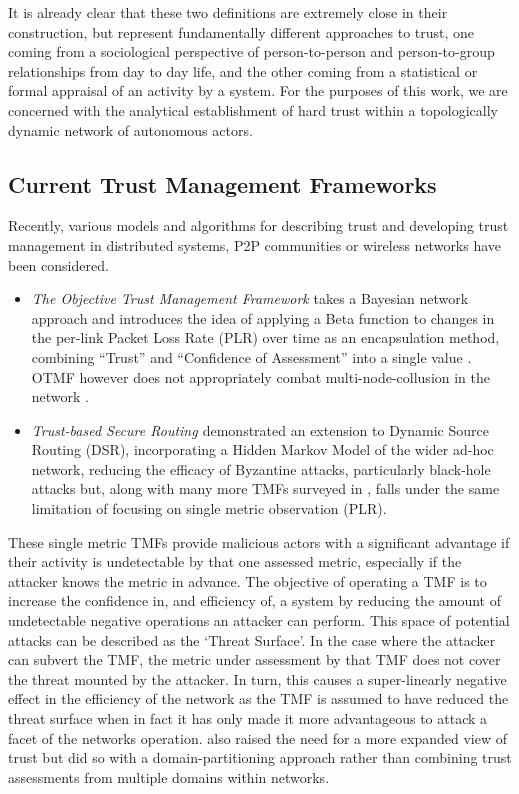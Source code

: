 \documentclass[runningheads,a4paper]{llncs}
\begin{document}
It is already clear that these two definitions are extremely close in their construction, but represent fundamentally different approaches to trust, one coming from a sociological perspective of person-to-person and person-to-group relationships from day to day life, and the other coming from a statistical or formal appraisal of an activity by a system.
For the purposes of this work, we  are concerned with the analytical establishment of hard trust within a topologically dynamic network of autonomous actors.

\subsection{Current Trust Management Frameworks}

Recently, various models and algorithms for describing trust and developing trust management in distributed systems, P2P communities or wireless networks have been considered.

\begin{itemize}
  \item \emph{The Objective Trust Management Framework} takes a Bayesian network approach and introduces the idea of applying a Beta function to changes in the per-link Packet Loss Rate (PLR) over time as an encapsulation method, combining ``Trust'' and ``Confidence of Assessment'' into a single value \cite{Li2008}. 
OTMF however does not appropriately combat multi-node-collusion in the network \cite{Cho2011}. 

  \item \emph{Trust-based Secure Routing \cite{Moe2008a}} demonstrated an extension to Dynamic Source Routing (DSR), incorporating a Hidden Markov Model of the wider ad-hoc network, reducing the efficacy of Byzantine attacks, particularly black-hole attacks but, along with many more TMFs surveyed in \cite{Cho2011}, falls under the same limitation of focusing on single metric observation (PLR). 
\end{itemize}

These single metric TMFs provide malicious actors with a significant advantage if their activity is undetectable by that one assessed metric, especially if the attacker knows the metric in advance. 
The objective of operating a TMF is to increase the confidence in, and efficiency of, a system by reducing the amount of undetectable negative operations an attacker can perform. 
This space of potential attacks can be described as the ‘Threat Surface’. 
In the case where the attacker can subvert the TMF, the metric under assessment by that TMF does not cover the threat mounted by the attacker. 
In turn, this causes a super-linearly negative effect in the efficiency of the network as the TMF is assumed to have reduced the threat surface when in fact it has only made it more advantageous to attack a facet of the networks operation.  
\cite{Huang2010a} also raised the need for a more expanded view of trust but did so with a domain-partitioning approach rather than combining trust assessments from multiple domains within networks. 
\end{document}
